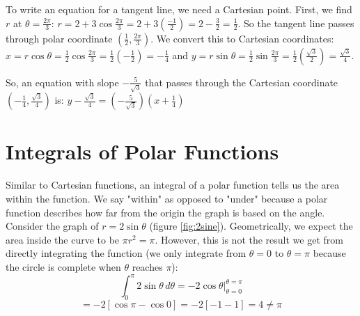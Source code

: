 \begin{Answer}[ref = polar3]
\begin{enumerate}
To write an equation for a tangent line, we need a Cartesian point. First, we 
find $r$ at $\theta = \frac{2\pi}{3}$: $r = 2 + 3\cos{\frac{2\pi}{3}} = 2 + 3 
\left( \frac{-1}{2}\right) = 2 - \frac{3}{2} = \frac{1}{2}$. So the tangent 
line passes through polar coordinate $\left( \frac{1}{2}, \frac{2\pi}{3} 
\right)$. We convert this to Cartesian coordinates: $x = r \cos{\theta} = 
\frac{1}{2} \cos{\frac{2\pi}{3}} = \frac{1}{2} \left(-\frac{1}{2} \right) = -
\frac{1}{4}$ and $y = r \sin{\theta} = \frac{1}{2} \sin{\frac{2\pi}{3}} = 
\frac{1}{2} \left( \frac{\sqrt{3}}{2}\right) = \frac{\sqrt{3}}{4}$. 

So, an equation with slope $-\frac{5}{\sqrt{3}}$ that passes through the 
Cartesian coordinate $\left( -\frac{1}{4}, \frac{\sqrt{3}}{4}\right)$ is: $y - 
\frac{\sqrt{3}}{4} = \left( -\frac{5}{\sqrt{3}} \right) \left(x + \frac{1}{4} 
\right)$
\end{enumerate}
\end{Answer}

\section{Integrals of Polar Functions}
Similar to Cartesian functions, an integral of a polar function tells us the 
area within the function. We say "within" as opposed to "under" because a 
polar function describes how far from the origin the graph is based on the 
angle. Consider the graph of $r = 2\sin{\theta}$ (figure \ref{fig:2sine}). 
Geometrically, we expect the area inside the curve to be $\pi r^2 = \pi$. 
However, this is not the result we get from directly integrating the function 
(we only integrate from $\theta = 0$ to $\theta = \pi$ because the circle is 
complete when $\theta$ reaches $\pi$): 
$$\int_0^{\pi} 2\sin{\theta}\,d\theta = -2\cos{\theta}|_{\theta = 0}^{\theta 
= \pi}$$
$$= -2 \left[ \cos{\pi} - \cos{0} \right] = -2 \left[ -1 - 1 \right] = 4 \neq 
\pi$$

